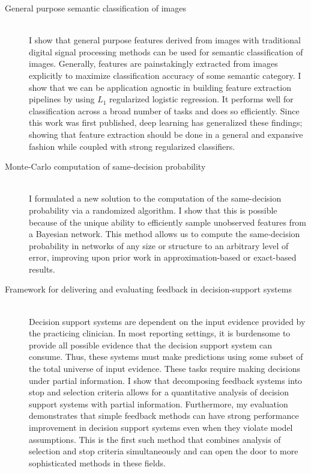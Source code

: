 \begin{description}
	\item[General purpose semantic classification of images] \hfill \\
	I show that general purpose features derived from images with traditional digital signal processing methods can be used for semantic classification of images. Generally, features are painstakingly extracted from images explicitly to maximize classification accuracy of some semantic category. I show that we can be application agnostic in building feature extraction pipelines by using $L_1$ regularized logistic regression. It performs well for classification across a broad number of tasks and does so efficiently. Since this work was first published, deep learning has generalized these findings; showing that feature extraction should be done in a general and expansive fashion while coupled with strong regularized classifiers.
	
	\item[Monte-Carlo computation of same-decision probability] \hfill \\
	I formulated a new solution to the computation of the same-decision probability via a randomized algorithm. I show that this is possible because of the unique ability to efficiently sample unobserved features from a Bayesian network. This method allows us to compute the same-decision probability in networks of any size or structure to an arbitrary level of error, improving upon prior work in approximation-based or exact-based results.
	
	\item[Framework for delivering and evaluating feedback in decision-support systems] \hfill \\
	Decision support systems are dependent on the input evidence provided by the practicing clinician. In most reporting settings, it is burdensome to provide all possible evidence that the decision support system can consume. Thus, these systems must make predictions using some subset of the total universe of input evidence. These tasks require making decisions under partial information. I show that decomposing feedback systems into stop and selection criteria allows for a quantitative analysis of decision support systems with partial information. Furthermore, my evaluation demonstrates that simple feedback methods can have strong performance improvement in decision support systems even when they violate model assumptions. This is the first such method that combines analysis of selection and stop criteria simultaneously and can open the door to more sophisticated methods in these fields.
\end{description}
